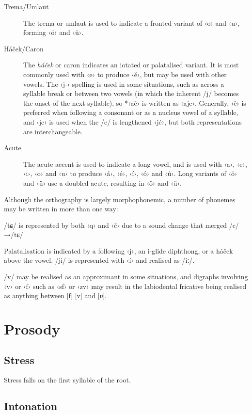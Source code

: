 \documentclass[grammar]{subfiles}
\begin{document}
	\begin{description}
		\item[Trema/Umlaut] The trema or umlaut is used to indicate a fronted variant of ‹o› and ‹u›, forming ‹ö› and ‹ü›.
		\item[Háček/Caron]\label{def:hacek} The \emph{háček} or caron indicates an iotated or palatalised variant. It is most commonly used with ‹e› to produce ‹ě›, but may be used with other vowels. The ‹j-› spelling is used in some situations, such as across a syllable break or between two vowels (in which the inherent /j/ becomes the onset of the next syllable), so *‹aě› is written as ‹aje›. Generally, ‹ě› is preferred when following a consonant or as a nucleus vowel of a syllable, and ‹je› is used when the /e/ is lengthened ‹jé›, but both representations are interchangeable.
		\item[Acute] The acute accent is used to indicate a long vowel, and is used with ‹a›, ‹e›, ‹i›, ‹o› and ‹u› to produce ‹á›, ‹é›, ‹í›, ‹ó› and ‹ú›. Long variants of ‹ö› and ‹ü› use a doubled acute, resulting in ‹ő› and ‹ű›. 
	\end{description}

	Although the orthography is largely morphophonemic, a number of phonemes may be written in more than one way:

	\begin{itemize*}
	\item	/tɕ/ is represented by both ‹q› and ‹č› due to a sound change that merged /c/→/tɕ/
	\item Palatalisation is indicated by a following ‹j›, an i-glide diphthong, or a háček above the vowel. /ji/ is represented with ‹í› and realised as /\superj iː/.
	\item /v/ may be realised as an approximant in some situations, and digraphs involving ‹v› or ‹f› such as ‹sf› or ‹zv› may result in the labiodental fricative being realised as anything between [f] [v] and [ʋ].
	\end{itemize*}

	\section{Prosody}
	\label{sec:prosody}

	\ToBeWritten

	\subsection{Stress}
	\label{ssec:stress}

	Stress falls on the first syllable of the root. \ToBeWritten

	\subsection{Intonation}
	\label{ssec:intonation}

	\ToBeWritten
\end{document}
